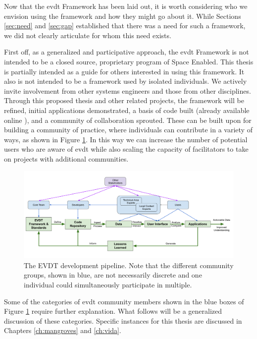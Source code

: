 Now that the \ac{evdt} Framework has been laid out, it is worth considering who we envision using the framework and how they might go about it. While Sections \ref{sec:need} and \ref{sec:gap} established that there was a need for such a framework, we did not clearly articulate for whom this need exists. 

First off, as a generalized and participative approach, the \ac{evdt} Framework is not intended to be a closed source, proprietary program of Space Enabled. This thesis is partially intended as a guide for others interested in using this framework. It also is not intended to be a framework used by isolated individuals. We actively invite involvement from other systems engineers and those from other disciplines. Through this proposed thesis and other related projects, the framework will be refined, initial applications demonstrated, a basis of code built (already available online \cite{bluerasterBlueRasterVida2021,reidEVDTRepository2020,reidMITVidaRepository2021}), and a community of collaboration sprouted. These can be built upon for building a community of practice, where individuals can contribute in a variety of ways, as shown in Figure \ref{fig:development}. In this way we can increase the number of potential users who are aware of \ac{evdt} while also scaling the capacity of facilitators to take on projects with additional communities.

\begin{figure}[h]
	\centering
	\includegraphics[scale=0.25]{Figures/chap3/Graphic_2_Development.png}
	\caption[The EVDT development pipeline] {The EVDT development pipeline. Note that the different community groups, shown in blue, are not necessarily discrete and one individual could simultaneously participate in multiple.}
	\label{fig:development}
\end{figure}

Some of the categories of \ac{evdt} community members shown in the blue boxes of Figure \ref{fig:development} require further explanation. What follows will be a generalized discussion of these categories. Specific instances for this thesis are discussed in Chapters \ref{ch:mangroves} and \ref{ch:vida}.

